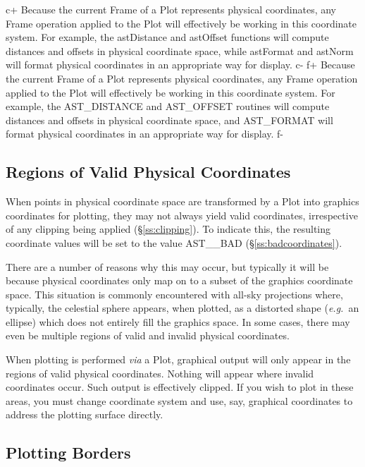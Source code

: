 \documentclass[twoside,11pt]{starlink}
\providecommand{\secref}[1]{\S\ref{#1}}
\begin{document}
c+
Because the current Frame of a Plot represents physical coordinates,
any Frame operation applied to the Plot will effectively be working in
this coordinate system. For example, the astDistance and astOffset
functions will compute distances and offsets in physical coordinate
space, while astFormat and astNorm will format physical coordinates in
an appropriate way for display.
c-
f+
Because the current Frame of a Plot represents physical coordinates,
any Frame operation applied to the Plot will effectively be working in
this coordinate system. For example, the AST\_DISTANCE and AST\_OFFSET
routines will compute distances and offsets in physical coordinate
space, and AST\_FORMAT will format physical coordinates in an
appropriate way for display.
f-

\subsection{\label{ss:validphysicalcoordinates}Regions of Valid Physical Coordinates}

When points in physical coordinate space are transformed by a Plot
into graphics coordinates for plotting, they may not always yield
valid coordinates, irrespective of any clipping being applied
(\secref{ss:clipping}). To indicate this, the resulting coordinate
values will be set to the value AST\_\_BAD
(\secref{ss:badcoordinates}).

There are a number of reasons why this may occur, but typically it
will be because physical coordinates only map on to a subset of the
graphics coordinate space. This situation is commonly encountered with
all-sky projections where, typically, the celestial sphere appears,
when plotted, as a distorted shape (\emph{e.g.}\ an ellipse) which
does not entirely fill the graphics space. In some cases, there may
even be multiple regions of valid and invalid physical coordinates.

When plotting is performed \emph{via} a Plot, graphical output will
only appear in the regions of valid physical coordinates. Nothing will
appear where invalid coordinates occur. Such output is effectively
clipped. If you wish to plot in these areas, you must change
coordinate system and use, say, graphical coordinates to address the
plotting surface directly.

\subsection{Plotting Borders}
\end{document}

